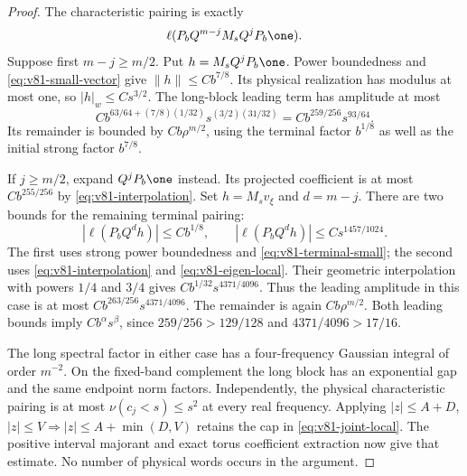 \begin{proof}
The characteristic pairing is exactly
\[
             \ell(P_bQ^{m-j}M_sQ^jP_b\one).
\]
Suppose first $m-j\ge m/2$. Put $h=M_sQ^jP_b\one$.
Power boundedness and \eqref{eq:v81-small-vector} give
$\|h\|\le Cb^{7/8}$. Its physical realization has modulus at most
one, so $|h|_w\le Cs^{3/2}$. The long-block leading term has
amplitude at most
\[
 Cb^{63/64+(7/8)(1/32)}s^{(3/2)(31/32)}
                  =Cb^{259/256}s^{93/64}.
\]
Its remainder is bounded by $Cb\rho^{m/2}$, using the terminal
factor $b^{1/8}$ as well as the initial strong factor $b^{7/8}$.

If $j\ge m/2$, expand $Q^jP_b\one$ instead. Its projected
coefficient is at most $Cb^{255/256}$ by
\eqref{eq:v81-interpolation}. Set $h=M_sv_\xi$ and $d=m-j$.
There are two bounds for the remaining terminal pairing:
\[
 |\ell(P_bQ^dh)|\le Cb^{1/8},\qquad
 |\ell(P_bQ^dh)|\le Cs^{1457/1024}.
\]
The first uses strong power boundedness and
\eqref{eq:v81-terminal-small}; the second uses
\eqref{eq:v81-interpolation} and \eqref{eq:v81-eigen-local}.
Their geometric interpolation with powers $1/4$ and $3/4$ gives
$Cb^{1/32}s^{4371/4096}$. Thus the leading amplitude in this
case is at most $Cb^{263/256}s^{4371/4096}$.
The remainder is again $Cb\rho^{m/2}$. Both leading bounds imply
$Cb^\alpha s^\beta$, since
$259/256>129/128$ and $4371/4096>17/16$.

The long spectral factor in either case has a four-frequency
Gaussian integral of order $m^{-2}$. On the fixed-band complement
the long block has an exponential gap and the same endpoint norm
factors. Independently, the physical characteristic pairing is at
most $\nu(c_j<s)\le s^2$ at every real frequency. Applying
$|z|\le A+D$, $|z|\le V\Rightarrow |z|\le A+\min(D,V)$
retains the cap in \eqref{eq:v81-joint-local}. The positive interval
majorant and exact torus coefficient extraction now give that
estimate. No number of physical words occurs in the argument.
\end{proof}
